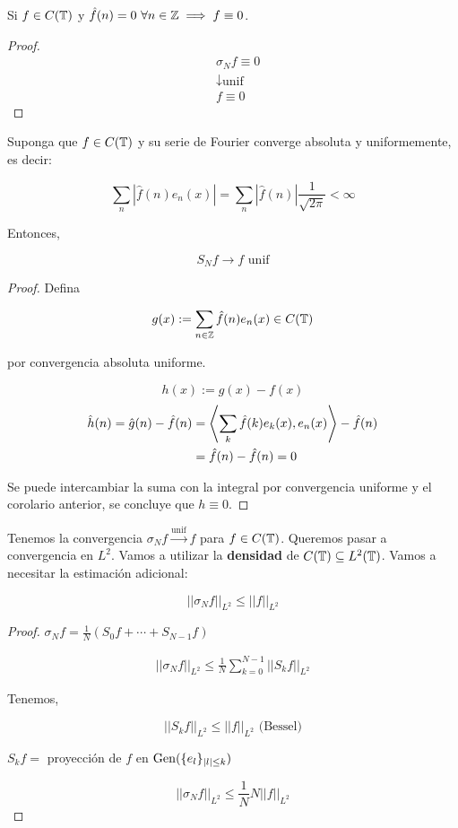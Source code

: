 \begin{fcorollary}
    Si $f\in C(\mathbb{T})$ y $\hat f(n)=0\ \forall n\in\mathbb{Z}\implies f\equiv 0$.
\end{fcorollary}

\begin{proof}
    \begin{align*}
        &\sigma_N f\equiv 0\\
        &\downarrow \text{unif}\\
        &f\equiv 0
    \end{align*}
\end{proof}

\begin{fcorollary}
    Suponga que $f\in C(\mathbb{T})$ y su serie de Fourier converge absoluta y uniformemente, es decir:

    \[\sum_n |\hat f(n) e_n(x)|=\sum_n |\hat f(n)|\frac{1}{\sqrt{2\pi}}<\infty\]

    Entonces, 

    \[S_N f\to f\text{ unif}\]
\end{fcorollary}

\begin{proof}
    Defina 

    \[g(x):=\sum_{n\in\mathbb{Z}}\hat f(n)e_n(x)\in C(\mathbb{T})\]

    por convergencia absoluta uniforme.

    \[h(x):=g(x)-f(x)\]
    \begin{align*}
        \hat h(n)=\hat g(n)-\hat f(n)&=\left\langle \sum_{k} \hat f(k)e_k(x),e_n(x)\right\rangle-\hat f(n)\\
        &=\hat f(n)-\hat f(n)=0
    \end{align*}

    Se puede intercambiar la suma con la integral por convergencia uniforme y el corolario anterior, se concluye que $h\equiv 0$.
\end{proof}

Tenemos la convergencia $\sigma_N f\xrightarrow{\text{unif}} f$ para $f\in C(\mathbb{T})$. Queremos pasar a convergencia en $L^2$. Vamos a utilizar la \textbf{densidad} de $C(\mathbb{T})\subseteq L^2(\mathbb{T})$. Vamos a necesitar la estimación adicional:

\begin{fproposition}
    \[||\sigma_N f||_{L^2}\leq ||f||_{L^2}\]
\end{fproposition}

\begin{proof}
    $\sigma_N f=\frac{1}{N}(S_0 f+\cdots+S_{N-1} f)$

    \begin{align*}
        ||\sigma_N f||_{L^2} \leq \frac{1}{N} \sum_{k=0}^{N-1} ||S_k f||_{L^2}
    \end{align*}

    Tenemos,

    \[||S_k f||_{L^2}\leq ||f||_{L^2}\text{ (Bessel)}\]

    $S_k f=$ proyección de $f$ en $\operatorname{Gen}(\{e_l\}_{|l|\leq k})$

    \[||\sigma_N f||_{L^2}\leq \frac{1}{N}N||f||_{L^2}\]
\end{proof}

